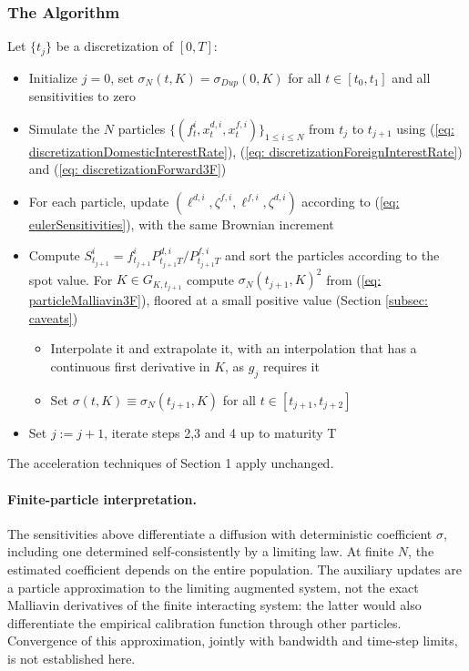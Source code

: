 \subsubsection*{The Algorithm}
Let $\{t_j\}$ be a discretization of $[0,T]$:
\begin{itemize}
\item[1.] Initialize $j=0$, set $\sigma_N(t,K)=\sigma_{Dup}(0,K)$ for all $t\in [t_0,t_1]$ and all sensitivities to zero
\item[2.] Simulate the $N$ particles  $\{(f_t^i, x_t^{d,i}, x^{f,i}_t) \}_{1\leq i\leq N}$ from  $t_{j}$ to  $t_{j+1}$ using  (\ref{eq: discretizationDomesticInterestRate}), (\ref{eq: discretizationForeignInterestRate}) and (\ref{eq: discretizationForward3F})
\item[3.] For each particle, update $(\ell^{d,i},\zeta^{f,i},\ell^{f,i},\zeta^{d,i})$ according to (\ref{eq: eulerSensitivities}), with the same Brownian increment
\item[4.] Compute $S^i_{t_{j+1}}=f^i_{t_{j+1}}P^{d,i}_{t_{j+1}T}/P^{f,i}_{t_{j+1}T}$ and sort the particles according to the spot value. For $K\in G_{K,t_{j+1}}$ compute $\sigma_N(t_{j+1},K)^2$ from (\ref{eq: particleMalliavin3F}), floored at a small positive value (Section \ref{subsec: caveats})
\begin{itemize}
\item Interpolate it and extrapolate it, with an interpolation that has a continuous first derivative in $K$, as $g_j$ requires it
\item Set $\sigma(t,K)\equiv \sigma_N(t_{j+1},K)$ for all $t\in [t_{j+1},t_{j+2}]$
\end{itemize}
\item[5.] Set $j:=j+1$, iterate steps 2,3 and 4 up to maturity T
\end{itemize}
The acceleration techniques of Section 1 apply unchanged.
\paragraph{Finite-particle interpretation.}
The sensitivities above differentiate a diffusion with deterministic coefficient
$\sigma$, including one determined self-consistently by a limiting law. At finite
$N$, the estimated coefficient depends on the entire population. The auxiliary
updates are a particle approximation to the limiting augmented system, not the
exact Malliavin derivatives of the finite interacting system: the latter would
also differentiate the empirical calibration function through other particles.
Convergence of this approximation, jointly with bandwidth and time-step limits,
is not established here.
